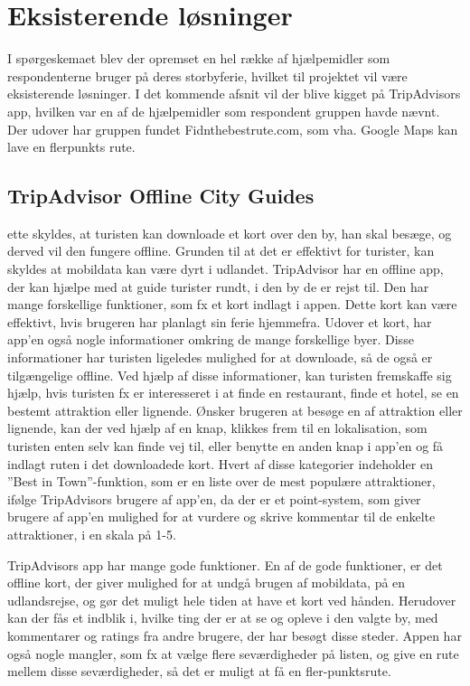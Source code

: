 \section{Eksisterende løsninger}
I spørgeskemaet blev der opremset en hel række af hjælpemidler som respondenterne bruger på deres storbyferie, hvilket til projektet vil være eksisterende løsninger. I det kommende afsnit vil der blive kigget på TripAdvisors app, hvilken var en af de hjælpemidler som respondent gruppen havde nævnt. Der udover har gruppen fundet Fidnthebestrute.com, som vha. Google Maps kan lave en flerpunkts rute.  

\subsection{TripAdvisor Offline City Guides}
ette skyldes, at turisten kan downloade et kort over den by, han skal besæge, og derved vil den fungere offline. Grunden til at det er effektivt for turister, kan skyldes at mobildata kan være dyrt i udlandet\citep {TDC}. \newline
TripAdvisor har en offline app, der kan hjælpe med at guide turister rundt, i den by de er rejst til. Den har mange forskellige funktioner, som fx et kort indlagt i appen. Dette kort kan være effektivt, hvis brugeren har planlagt sin ferie hjemmefra.\newline
Udover et kort, har app'en også nogle informationer omkring de mange forskellige byer. Disse informationer har turisten ligeledes mulighed for at downloade, så de også er tilgængelige offline. Ved hjælp af disse informationer, kan turisten fremskaffe sig hjælp, hvis turisten fx er interesseret i at finde en restaurant, finde et hotel, se en bestemt attraktion eller lignende. Ønsker brugeren at besøge en af attraktion eller lignende, kan der ved hjælp af en knap, klikkes frem til en lokalisation, som turisten enten selv kan finde vej til, eller benytte en anden knap i app'en og få indlagt ruten i det downloadede kort.\newline
Hvert af disse kategorier indeholder en ”Best in Town”-funktion, som er en liste over de mest populære attraktioner, ifølge TripAdvisors brugere af app'en, da der er et point-system, som giver brugere af app'en mulighed for at vurdere og skrive kommentar til de enkelte attraktioner, i en skala på 1-5. \newline

TripAdvisors app har mange gode funktioner. En af de gode funktioner, er det offline kort, der giver mulighed for at undgå brugen af mobildata, på en udlandsrejse, og gør det muligt hele tiden at have et kort ved hånden. Herudover kan der fås et indblik i, hvilke ting der er at se og opleve i den valgte by, med kommentarer og ratings fra andre brugere, der har besøgt disse steder.
Appen har også nogle mangler, som fx at vælge flere seværdigheder på listen, og give en rute mellem disse seværdigheder, så det er muligt at få en fler-punktsrute. \newline
